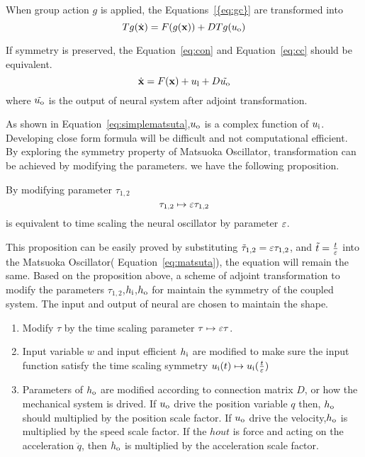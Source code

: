 When group action $g$ is applied, the Equations~\ref{{eq:gc}} are transformed into
\begin{equation}
\label{eq:cc}
Tg(\dot{\mathbf{x}})=F(g(\mathbf{x}))+DTg(u_{\mathrm{o}})
\end{equation}




If symmetry is preserved, the Equation~\ref{eq:con} and Equation~\ref{eq:cc} should be equivalent.
\begin{equation}
\label{eq:con}
\dot{\mathbf{x}}=F(\mathbf{x})+u_{\mathrm{l}}+D\tilde{u_{\mathrm{o}}}
\end{equation}
where $\tilde{u_{\mathrm{o}}}$ is the output of neural system after adjoint transformation.

As shown in Equation~\ref{eq:simplematsuta},$u_{\mathrm{o}}$ is a complex function of $u_{\mathrm{i}}$.
Developing close form formula will be difficult and not computational efficient.
By exploring the symmetry property of Matsuoka Oscillator, transformation can be achieved by modifying the parameters.
we have the following proposition.


\begin{myprop}
By modifying parameter $\tau_{1,2}$
\[
\tau_{1,2} \mapsto \varepsilon \tau_{1,2}
\]
is equivalent to time scaling the neural oscillator by parameter $\varepsilon$.
\end{myprop}

This proposition can be easily proved by  substituting $\tilde{\tau}_{1,2}=\varepsilon \tau_{1,2}$, and $\tilde{t}=\frac{t}{\varepsilon}$ into the Matsuoka Oscillator( Equation~\ref{eq:matsuta}), the equation will remain the same.
Based on the proposition above, a scheme of adjoint transformation to modify the parameters $\tau_{1,2}$,$h_{\mathrm{i}}$,$h_{\mathrm{o}}$ for maintain the symmetry of the  coupled system.
The input and output of neural are chosen to maintain the shape.
\begin{enumerate}
\item Modify $\tau$ by the time scaling parameter $\tau \mapsto \varepsilon \tau$.
\item Input variable $w$ and input efficient $h_{\mathrm{i}}$ are modified to make sure the input function satisfy the time scaling symmetry $u_{\mathrm{i}}(t) \mapsto u_{\mathrm{i}}(\frac{t}{\varepsilon})$
\item  Parameters of $h_{\mathrm{o}}$ are modified according to connection matrix $D$, or how the mechanical system is drived.
If $u_{\mathrm{o}}$ drive the position variable $q$ then, $h_{\mathrm{o}}$ should multiplied by the position scale factor. 
If $u_{\mathrm{o}}$ drive the velocity,$h_{\mathrm{o}}$ is multiplied by the speed scale factor.
If the $hout$ is force and acting on the acceleration $\ddot{q}$, then $h_{\mathrm{o}}$ is multiplied by the acceleration scale factor.
\end{enumerate}


